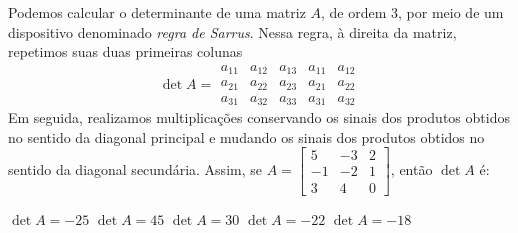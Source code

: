 Podemos calcular o determinante de uma matriz $A$, de ordem $3$, por meio de um dispositivo denominado {\it regra de Sarrus}. Nessa regra, à direita da matriz, repetimos suas duas primeiras colunas
\[\det A = \begin{array}{|ccc|cc}
a_{11} &  a_{12}  &  a_{13}  &  a_{11}  &  a_{12}\\
a_{21} &  a_{22}  &  a_{23}  &  a_{21}  &  a_{22}\\
a_{31} &  a_{32}  &  a_{33}  &  a_{31}  &  a_{32}
\end{array} \]
Em seguida, realizamos multiplicações conservando os sinais dos produtos obtidos no sentido da diagonal principal e mudando os sinais dos produtos obtidos no sentido da diagonal secundária. Assim,
se $A = \left[ \begin{array}{ccc}
     5  &  -3 &    2\\
     -1  &  -2  &   1\\
     3   &  4   &  0
\end{array} \right]$, então $\det A$ é:

$\det A = -25$
$\det A = 45$
$\det A = 30$
$\det A = -22$
$\det A = -18$


